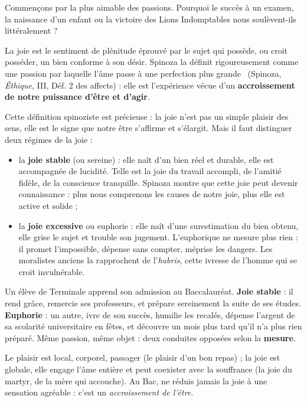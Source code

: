 \documentclass[11pt]{article}
\newcommand{\cle}[1]{{\popxbold\color{popdark}#1}}
\begin{document}
Commençons par la plus aimable des passions. Pourquoi le succès à un examen, la naissance d'un enfant ou la victoire des Lions Indomptables nous soulèvent-ils littéralement ?

\begin{definition}[La joie]
La \cle{joie} est le sentiment de plénitude éprouvé par le sujet qui possède, ou croit posséder, un bien conforme à son désir. Spinoza la définit rigoureusement comme \guillemotleft une passion par laquelle l'âme passe à une perfection plus grande \guillemotright\ (Spinoza, \emph{Éthique}, III, Déf. 2 des affects) : elle est l'expérience vécue d'un \textbf{accroissement de notre puissance d'être et d'agir}.
\end{definition}

Cette définition spinoziste est précieuse : la joie n'est pas un simple plaisir des sens, elle est le signe que notre être s'affirme et s'élargit. Mais il faut distinguer deux régimes de la joie :

\begin{itemize}
\item la \textbf{joie stable} (ou sereine) : elle naît d'un bien réel et durable, elle est accompagnée de lucidité. Telle est la joie du travail accompli, de l'amitié fidèle, de la conscience tranquille. Spinoza montre que cette joie peut devenir connaissance : plus nous comprenons les causes de notre joie, plus elle est active et solide ;
\item la \textbf{joie excessive} ou \cle{euphorie} : elle naît d'une surestimation du bien obtenu, elle grise le sujet et trouble son jugement. L'euphorique ne mesure plus rien : il promet l'impossible, dépense sans compter, méprise les dangers. Les moralistes anciens la rapprochent de l'\emph{hubris}, cette ivresse de l'homme qui se croit invulnérable.
\end{itemize}

\begin{exemplebox}
Un élève de Terminale apprend son admission au Baccalauréat. \textbf{Joie stable} : il rend grâce, remercie ses professeurs, et prépare sereinement la suite de ses études. \textbf{Euphorie} : un autre, ivre de son succès, humilie les recalés, dépense l'argent de sa scolarité universitaire en fêtes, et découvre un mois plus tard qu'il n'a plus rien préparé. Même passion, même objet : deux conduites opposées selon la \textbf{mesure}.
\end{exemplebox}

\begin{attention}
Le plaisir est local, corporel, passager (le plaisir d'un bon repas) ; la joie est globale, elle engage l'âme entière et peut coexister avec la souffrance (la joie du martyr, de la mère qui accouche). Au Bac, ne réduis jamais la joie à une sensation agréable : c'est un \emph{accroissement de l'être}.
\end{attention}
\end{document}
